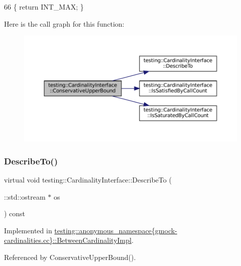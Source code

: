 \begin{DoxyCode}
66 \{ \textcolor{keywordflow}{return} INT\_MAX; \}
\end{DoxyCode}
Here is the call graph for this function\+:
\nopagebreak
\begin{figure}[H]
\begin{center}
\leavevmode
\includegraphics[width=350pt]{classtesting_1_1CardinalityInterface_ac741b28605377d603623dddf4b1c8d33_cgraph}
\end{center}
\end{figure}
\mbox{\label{classtesting_1_1CardinalityInterface_a8a93e3bbf24d14fe21186802ecef0929}} 
\subsubsection{\texorpdfstring{Describe\+To()}{DescribeTo()}}
{\footnotesize\ttfamily virtual void testing\+::\+Cardinality\+Interface\+::\+Describe\+To (\begin{DoxyParamCaption}\item[{\+::std\+::ostream $\ast$}]{os }\end{DoxyParamCaption}) const\hspace{0.3cm}{\ttfamily [pure virtual]}}



Implemented in \hyperlink{classtesting_1_1anonymous__namespace_02gmock-cardinalities_8cc_03_1_1BetweenCardinalityImpl_a8768e68b374d5a1103890284ea4fe332}{testing\+::anonymous\+\_\+namespace\{gmock-\/cardinalities.\+cc\}\+::\+Between\+Cardinality\+Impl}.



Referenced by Conservative\+Upper\+Bound().

